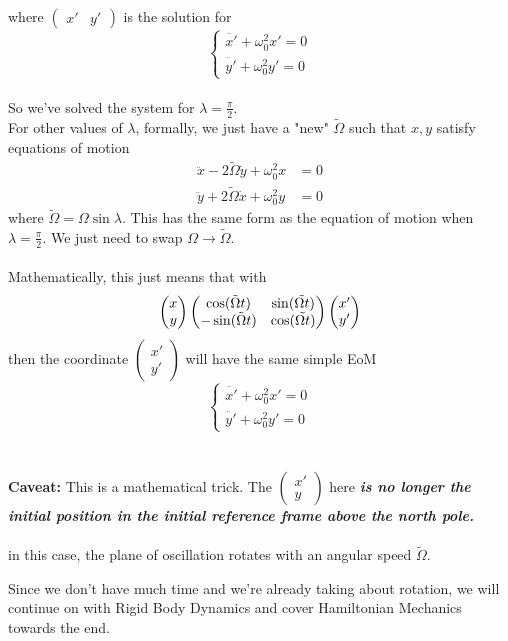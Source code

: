 \documentclass[11pt]{article}
\begin{document}
where $\begin{pmatrix}
  x' & y'
\end{pmatrix}$ is the solution for 
\[ \begin{cases}
  \ddot{x'} + \omega_0^2 x' = 0 \\
  \ddot{y'} + \omega_0^2 y' = 0 
\end{cases} \]
\\
So we've solved the system for $\lambda = \frac{\pi}{2}$. 
\\
For other values of $\lambda$, formally, we just have a "new" $\tilde{\Omega}$ such that $x, y$ satisfy equations of motion 
\begin{align*}
  \ddot{x} - 2\tilde{\Omega} \dot{y} + \omega_0^2 x &= 0 \\
  \ddot{y} + 2\tilde{\Omega} \dot{x} + \omega_0^2 y &= 0 
\end{align*}
where $\tilde{\Omega} = \Omega \sin\lambda$. This has the same form as the equation of motion when $\lambda = \frac{\pi}{2}$. We just need to swap $\Omega \rightarrow \tilde{\Omega}$.
\\
\\
Mathematically, this just means that with 
\begin{align*}
  \begin{pmatrix}
    x \\ y
  \end{pmatrix} \begin{pmatrix}
    \cos(\tilde{\Omega} t) & \sin(\Tilde{\Omega t}) \\
    -\sin(\tilde{\Omega} t) & \cos(\Tilde{\Omega t})
  \end{pmatrix} \begin{pmatrix}
    x' \\ y'
  \end{pmatrix}
\end{align*}
then the coordinate $\begin{pmatrix}
  x' \\ y'
\end{pmatrix}$ will have the same simple EoM
\[ \begin{cases}
  \ddot{x'} + \omega_0^2 x' = 0 \\
  \ddot{y'} + \omega_0^2 y' = 0 
\end{cases} \]
\\
\\
\textbf{Caveat:} This is a mathematical trick. The $\begin{pmatrix}
x' \\ y
\end{pmatrix}$ here \textbf{\emph{is no longer the initial position in the initial reference frame above the north pole.}}
\\
\\
in this case, the plane of oscillation rotates with an angular speed $\tilde{\Omega}$.
\\
\begin{redbox}
  Since we don't have much time and we're already taking about rotation, we will continue on with Rigid Body Dynamics and cover Hamiltonian Mechanics towards the end.
\end{redbox}
\end{document}
